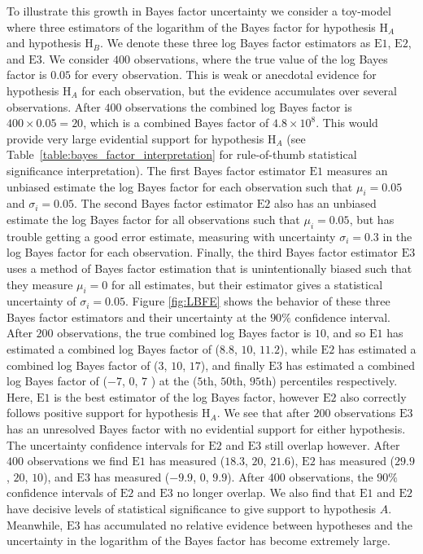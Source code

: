 To illustrate this growth in Bayes factor uncertainty we consider a toy-model where three estimators of the logarithm of the Bayes factor for hypothesis $\mathrm{H}_A$ and hypothesis $\mathrm{H}_B$. We denote these three log Bayes factor estimators as $\mathrm{E1}$, $\mathrm{E2}$, and $\mathrm{E3}$. We consider $400$ observations, where the true value of the log Bayes factor is $0.05$ for every observation. This is weak or anecdotal evidence for hypothesis $\mathrm{H}_A$ for each observation, but the evidence accumulates over several observations. After $400$ observations the combined log Bayes factor is $400 \times 0.05 = 20$, which is a combined Bayes factor of $4.8 \times 10^8$. This would provide very large evidential support for hypothesis $\mathrm{H}_A$ (see Table~\ref{table:bayes_factor_interpretation} for rule-of-thumb statistical significance interpretation). The first Bayes factor estimator $\mathrm{E1}$ measures an unbiased estimate the log Bayes factor for each observation such that $\mu_i = 0.05$ and $\sigma_i = 0.05$. The second Bayes factor estimator $\mathrm{E2}$ also has an unbiased estimate the log Bayes factor for all observations such that $\mu_i = 0.05$, but has trouble getting a good error estimate, measuring with uncertainty $\sigma_i = 0.3$ in the log Bayes factor for each observation. Finally, the third Bayes factor estimator $\mathrm{E3}$ uses a method of Bayes factor estimation that is unintentionally biased such that they measure $\mu_i=0$ for all estimates, but their estimator gives a statistical uncertainty of $\sigma_i = 0.05$. Figure \ref{fig:LBFE} shows the behavior of these three Bayes factor estimators and their uncertainty at the $90 \%$ confidence interval. After $200$ observations, the true combined log Bayes factor is $10$, and so $\mathrm{E1}$ has estimated a combined log Bayes factor of ($8.8$, $10$, $11.2$), while $\mathrm{E2}$ has estimated a combined log Bayes factor of ($3$, $10$, $17$), and finally $\mathrm{E3}$ has estimated a combined log Bayes factor of ($-7$, $0$, $7$ )  at the ($5$th, $50$th, $95$th) percentiles respectively. Here, $\mathrm{E1}$ is the best estimator of the log Bayes factor, however $\mathrm{E2}$ also correctly follows positive support for hypothesis $\mathrm{H}_A$. We see that after $200$ observations $\mathrm{E3}$ has an unresolved Bayes factor with no evidential support for either hypothesis. The uncertainty confidence intervals for $\mathrm{E2}$ and $\mathrm{E3}$ still overlap however. After $400$ observations we find $\mathrm{E1}$ has measured ($18.3$, $20$, $21.6$), $\mathrm{E2}$ has measured ($29.9$, $20$, $10$), and $\mathrm{E3}$ has measured ($-9.9$, $0$, $9.9$). After $400$ observations, the $90 \%$ confidence intervals of $\mathrm{E2}$ and $\mathrm{E3}$ no longer overlap. We also find that $\mathrm{E1}$ and $\mathrm{E2}$ have decisive levels of statistical significance to give support to hypothesis $A$. Meanwhile, $\mathrm{E3}$ has accumulated no relative evidence between hypotheses and the uncertainty in the logarithm of the Bayes factor has become extremely large. 


